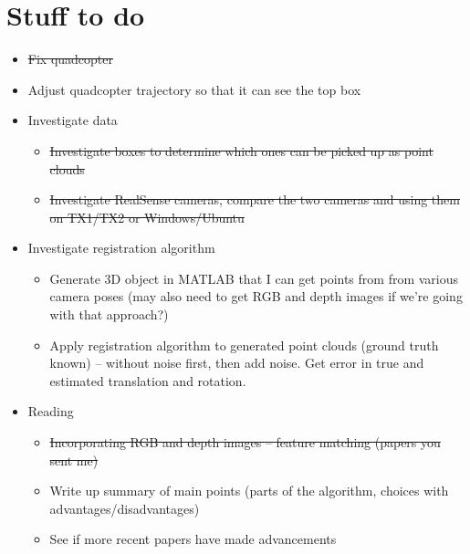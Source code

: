 \documentclass[12pt,a4paper]{article}
\begin{document}
\section{Stuff to do}
\begin{itemize}
\item \sout{Fix quadcopter}
\item Adjust quadcopter trajectory so that it can see the top box
\item Investigate data
\begin{itemize}
\item \sout{Investigate boxes to determine which ones can be picked up as point clouds}
\item \sout{Investigate RealSense cameras, compare the two cameras and using them on TX1/TX2 or Windows/Ubuntu}
\end{itemize}
\item Investigate registration algorithm
\begin{itemize}
\item Generate 3D object in MATLAB that I can get points from from various camera poses (may also need to get RGB and depth images if we're going with that approach?)
\item Apply registration algorithm to generated point clouds (ground truth known) -- without noise first, then add noise. Get error in true and estimated translation and rotation.
\end{itemize}
\item Reading
\begin{itemize}
\item \sout{Incorporating RGB and depth images -- feature matching (papers you sent me)}
\item Write up summary of main points (parts of the algorithm, choices with advantages/disadvantages)
\item See if more recent papers have made advancements
\end{itemize}
\end{itemize}
\end{document}
